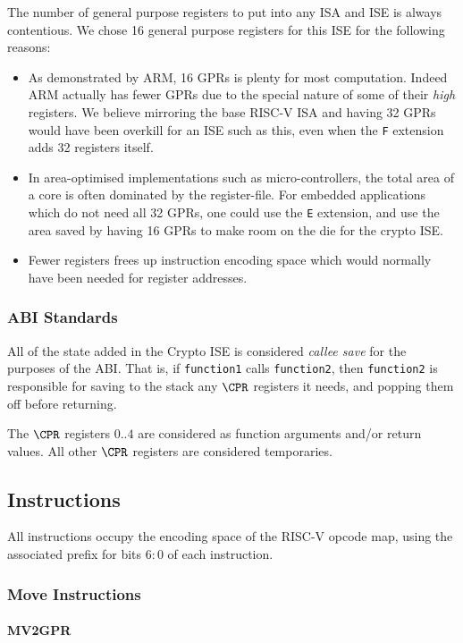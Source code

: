 The number of general purpose registers to put into any ISA and ISE is
always contentious. We chose 16 general purpose registers for this ISE
for the following reasons:
\begin{itemize}
\item As demonstrated by ARM, 16 GPRs is plenty for most computation. Indeed
ARM actually has fewer GPRs due to the special nature of some of their
{\em high} registers. We believe mirroring the base RISC-V ISA and having
32 GPRs would have been overkill for an ISE such as this, even when the
{\tt F} extension adds 32 registers itself.
\item In area-optimised implementations such as micro-controllers, the
total area of a core is often dominated by the register-file. For embedded
applications which do not need all 32 GPRs, one could use the {\tt E}
extension, and use the area saved by having 16 GPRs to make room on the die
for the crypto ISE.
\item Fewer registers frees up instruction encoding space which would
normally have been needed for register addresses.
\end{itemize}

\subsubsection{ABI Standards}

All of the state added in the Crypto ISE is considered {\em callee save}
for the purposes of the ABI. That is, if {\tt function1} calls 
{\tt function2}, then {\tt function2} is responsible for saving to the
stack any $\CPR$ registers it needs, and popping them off before returning.

The $\CPR$ registers $0..4$ are considered as function arguments
and/or return values. 
All other $\CPR$ registers are considered temporaries.

\subsection{Instructions}

All instructions occupy the \encspace encoding space of the RISC-V opcode
map, using the associated \encopcode prefix for bits $6:0$ of each 
instruction.

\subsubsection{Move Instructions}
\paragraph{MV2GPR}

